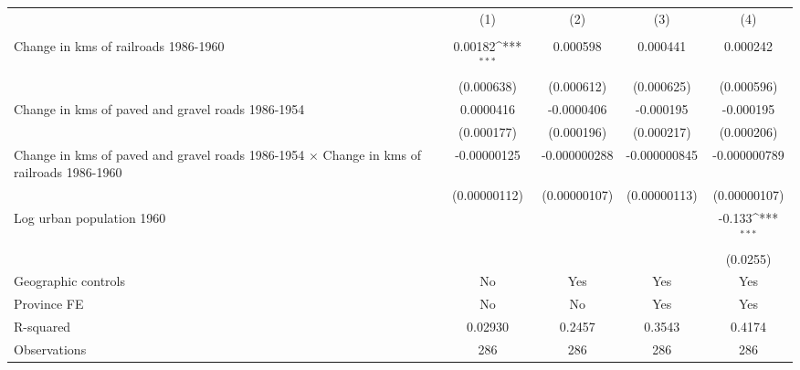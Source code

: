 {
\def\sym#1{\ifmmode^{#1}\else\(^{#1}\)\fi}
\begin{tabular}{l*{4}{c}}
\hline\hline
                &\multicolumn{1}{c}{(1)}&\multicolumn{1}{c}{(2)}&\multicolumn{1}{c}{(3)}&\multicolumn{1}{c}{(4)}\\
                &\multicolumn{1}{c}{}&\multicolumn{1}{c}{}&\multicolumn{1}{c}{}&\multicolumn{1}{c}{}\\
\hline
Change in kms of railroads 1986-1960&  0.00182\sym{***}& 0.000598         & 0.000441         & 0.000242         \\
                &(0.000638)         &(0.000612)         &(0.000625)         &(0.000596)         \\
[1em]
Change in kms of paved and gravel roads 1986-1954&0.0000416         &-0.0000406         &-0.000195         &-0.000195         \\
                &(0.000177)         &(0.000196)         &(0.000217)         &(0.000206)         \\
[1em]
Change in kms of paved and gravel roads 1986-1954 $\times$ Change in kms of railroads 1986-1960&-0.00000125         &-0.000000288         &-0.000000845         &-0.000000789         \\
                &(0.00000112)         &(0.00000107)         &(0.00000113)         &(0.00000107)         \\
[1em]
Log urban population 1960&                  &                  &                  &   -0.133\sym{***}\\
                &                  &                  &                  & (0.0255)         \\
\hline
Geographic controls&       No         &      Yes         &      Yes         &      Yes         \\
Province FE     &       No         &       No         &      Yes         &      Yes         \\
R-squared       &  0.02930         &   0.2457         &   0.3543         &   0.4174         \\
Observations    &      286         &      286         &      286         &      286         \\
\hline\hline
\end{tabular}
}
